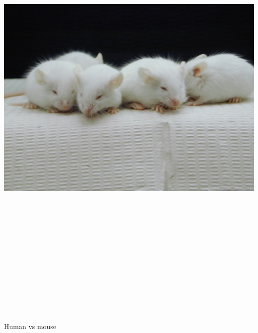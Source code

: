 \documentclass[12pt]{article}
\newcommand{\headsize}{\fontsize{35}{35} \selectfont}
\begin{document}
\centerline{\includegraphics[height=9in]{Figs/inbredmice.jpg}}


\newpage

\headsize \color{myyellow}
\hfill \begin{minipage}{5.75in}
\centering
Human vs mouse
\end{minipage}

\vspace{3cm}
\end{document}
